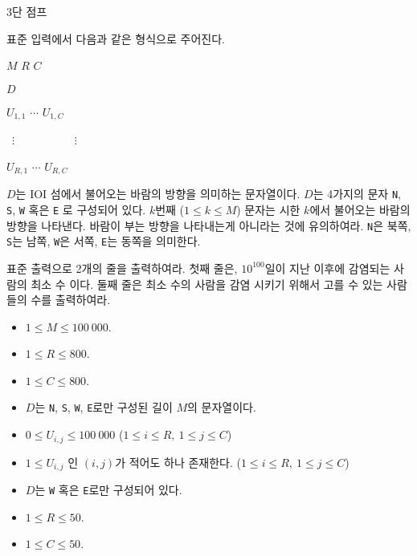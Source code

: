 \begin{problem}{3단 점프}
	
	\InputFile
	
	표준 입력에서 다음과 같은 형식으로 주어진다. 
	
	$M$ $R$ $C$
	
	$D$
	
	$U_{1, 1}$ $\cdots$ $U_{1, C}$

	\ $\vdots$ \ \ \ \ \ \ \ \ \ \ $\vdots$	
	
	$U_{R, 1}$ $\cdots$ $U_{R, C}$
	
	$D$는 IOI 섬에서 불어오는 바람의 방향을 의미하는 문자열이다. $D$는 4가지의 문자 \texttt{N}, \texttt{S}, \texttt{W} 혹은 \texttt{E} 로 구성되어 있다. $k$번째 ($1 \le k \le M$) 문자는 시한 $k$에서 불어오는 바람의 방향을 나타낸다. 바람이 부는 방향을 나타내는게 아니라는 것에 유의하여라. \texttt{N}은 북쪽, \texttt{S}는 남쪽, \texttt{W}은 서쪽, \texttt{E}는 동쪽을 의미한다.
	
	\OutputFile
	
	표준 출력으로 2개의 줄을 출력하여라.
	첫째 줄은, $10^{100}$일이 지난 이후에 감염되는 사람의 최소 수 이다. 둘째 줄은 최소 수의 사람을 감염 시키기 위해서 고를 수 있는 사람들의 수를 출력하여라.
	
	\Constraints
	
	\begin{itemize}
		
		\item $1 \le M \le 100\ 000$.
		\item $1 \le R \le 800$.
		\item $1 \le C \le 800$.
		\item $D$는 \texttt{N}, \texttt{S}, \texttt{W}, \texttt{E}로만 구성된 길이 $M$의 문자열이다.
		\item $0 \le U_{i, j} \le 100\ 000$ ($1 \le i \le R, \ 1 \le j \le C$)
		\item $1 \le U_{i, j}$ 인 $(i, j)$가 적어도 하나 존재한다. ($1 \le i \le R, \ 1 \le j \le C$)
	\end{itemize}
	
	
	\begin{itemize}
		\item $D$는 \texttt{W} 혹은 \texttt{E}로만 구성되어 있다.
	\end{itemize}
	
	\begin{itemize}
		\item $1 \le R \le 50$.
		\item $1 \le C \le 50$.
	\end{itemize}
	

\end{problem}
